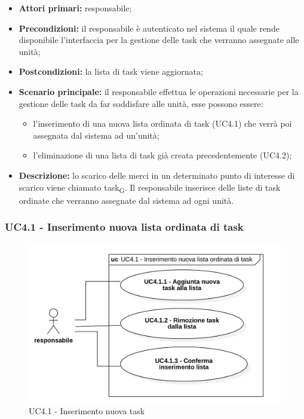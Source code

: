 \begin{itemize}
	\item 	\textbf{Attori primari:} responsabile;
	\item 	\textbf{Precondizioni:} il responsabile è autenticato nel sistema il quale rende disponibile l'interfaccia per la gestione delle task che verranno assegnate alle unità;
	\item 	\textbf{Postcondizioni:} la lista di task viene aggiornata;
	\item 	\textbf{Scenario principale:} il responsabile effettua le operazioni necessarie per la gestione delle task da far soddisfare alle unità, esse possono essere:
	\begin{itemize}
		\item l'inserimento di una nuova lista ordinata di task (UC4.1) che verrà poi assegnata dal sistema ad un'unità;
		\item l'eliminazione di una lista di task già creata precedentemente (UC4.2);
	\end{itemize}
	\item 	\textbf{Descrizione:} lo scarico delle merci in un determinato punto di interesse di scarico viene chiamato task\textsubscript{G}. Il responsabile inserisce delle liste di task ordinate che verranno assegnate dal sistema ad ogni unità. 

\end{itemize}

\subsubsection{UC4.1 - Inserimento nuova lista ordinata di task}

\begin{figure}[H]
	\centering
	\includegraphics[scale=0.52]{res/images/uc4-1.png}
	\caption{UC4.1 - Inserimento nuova task}
\end{figure}

